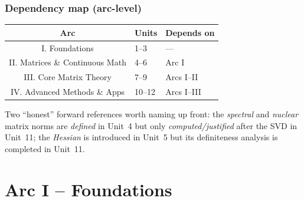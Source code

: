 \documentclass[11pt]{article}
\theoremstyle{definition}
\begin{document}
\section*{Dependency map (arc-level)}
\begin{center}
\renewcommand{\arraystretch}{1.25}
\begin{tabular}{@{}c l l@{}}
\toprule
\textbf{Arc} & \textbf{Units} & \textbf{Depends on} \\
\midrule
I.   Foundations                 & 1--3   & --- \\
II.  Matrices \& Continuous Math  & 4--6   & Arc I \\
III. Core Matrix Theory          & 7--9   & Arcs I--II \\
IV.  Advanced Methods \& Apps     & 10--12 & Arcs I--III \\
\bottomrule
\end{tabular}
\end{center}

\noindent Two ``honest'' forward references worth naming up front:
the \emph{spectral} and \emph{nuclear} matrix norms are \emph{defined} in
Unit~4 but only \emph{computed/justified} after the SVD in Unit~11; the
\emph{Hessian} is introduced in Unit~5 but its definiteness analysis is
completed in Unit~11.

\part*{Arc I -- Foundations}

\end{document}
